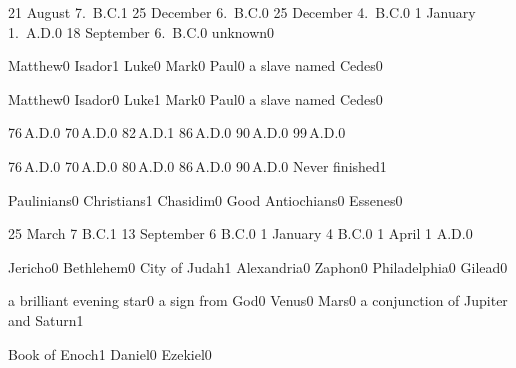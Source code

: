 
{21 August 7.~B.C.}{1}
{25 December 6.~B.C.}{0}
{25 December 4.~B.C.}{0}
{1 January 1.~A.D.}{0}
{18 September 6.~B.C.}{0}
{unknown}{0}
\qstop


{Matthew}{0}
{Isador}{1}
{Luke}{0}
{Mark}{0}
{Paul}{0}
{a slave named Cedes}{0}
\qstop

{Matthew}{0}
{Isador}{0}
{Luke}{1}
{Mark}{0}
{Paul}{0}
{a slave named Cedes}{0}
\qstop

{76\,A.D.}{0}
{70\,A.D.}{0}
{82\,A.D.}{1}
{86\,A.D.}{0}
{90\,A.D.}{0}
{99\,A.D.}{0}
\qstop

{76\,A.D.}{0}
{70\,A.D.}{0}
{80\,A.D.}{0}
{86\,A.D.}{0}
{90\,A.D.}{0}
{Never finished}{1}
\qstop

{Paulinians}{0}
{Christians}{1}
{Chasidim}{0}
{Good Antiochians}{0}
{Essenes}{0}
\qstop


{25 March 7 B.C.}{1}
{13 September 6 B.C.}{0}
{1 January 4 B.C.}{0}
{1 April 1 A.D.}{0}
\qstop

{Jericho}{0}
{Bethlehem}{0}
{City of Judah}{1}
{Alexandria}{0}
{Zaphon}{0}
{Philadelphia}{0}
{Gilead}{0}
\qstop

{a brilliant evening star}{0}
{a sign from God}{0}
{Venus}{0}
{Mars}{0}
{a conjunction of Jupiter and Saturn}{1}
\qstop





{Book of Enoch}{1}
{Daniel}{0}
{Ezekiel}{0}
\qstop




